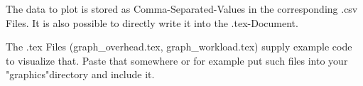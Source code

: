 
The data to plot is stored as Comma-Separated-Values in the corresponding .csv Files.
It is also possible to directly write it into the .tex-Document.

The .tex Files (graph\_overhead.tex, graph\_workload.tex) supply example code to visualize that. Paste that somewhere or for example put such files into your "graphics"directory and include it.

%
%